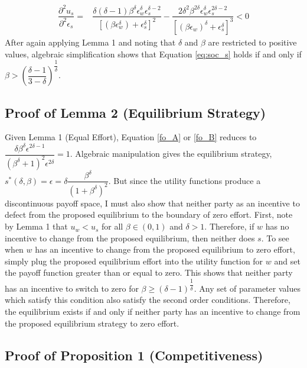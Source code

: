 \documentclass[12pt]{article}
\begin{document}
\begin{appendix}
\begin{align}
\label{eq:soc_s} \dfrac{\partial ^2u_s}{\partial ^2\epsilon_s} = &\dfrac{\delta (\delta - 1) \beta^\delta \epsilon_w^{\delta} \epsilon_s^{\delta-2}}{[(\beta\epsilon_w^\delta) + \epsilon_s^\delta]^2} -\dfrac{2\delta^2 \beta^{2\delta} \epsilon_w^{\delta} \epsilon_s^{2\delta-2}}{[(\beta\epsilon_w)^\delta + \epsilon_s^\delta]^3} < 0
\end{align}
After again applying Lemma 1 and noting that $\delta$ and $\beta$ are restricted to positive values, algebraic simplification shows that Equation \ref{eq:soc_s} holds if and only if $\beta > \left (\dfrac{\delta - 1}{3 - \delta} \right ) ^{\dfrac{1}{\delta}}$.

\subsection*{Proof of Lemma 2 (Equilibrium Strategy)}

Given Lemma 1 (Equal Effort), Equation \ref{fo_A} or \ref{fo_B} reduces to $\dfrac{\delta\beta^\delta\epsilon^{2\delta-1}}{(\beta^\delta + 1)^2\epsilon^{2\delta}} = 1$. Algebraic manipulation gives the equilibrium strategy, $s^*(\delta, \beta) = \epsilon = \delta\dfrac{\beta^\delta}{(1+ \beta^\delta)^2}$. But since the utility functions produce a discontinuous payoff space, I must also show that neither party as an incentive to defect from the proposed equilibrium to the boundary of zero effort. First, note by Lemma 1 that $u_w < u_s$ for all $\beta \in (0, 1)$ and $\delta >  1$. Therefore, if $w$ has no incentive to change from the proposed equilibrium, then neither does $s$. To see when $w$ has an incentive to change from the proposed equilibrium to zero effort, simply plug the proposed equilibrium effort into the utility function for $w$ and set the payoff function greater than or equal to zero. This shows that neither party has an incentive to switch to zero for $\beta \geq (\delta - 1)^{\dfrac{1}{\delta}}$. Any set of parameter values which satisfy this condition also satisfy the second order conditions. Therefore, the equilibrium exists if and only if neither party has an incentive to change from the proposed equilibrium strategy to zero effort.

\subsection*{Proof of Proposition 1 (Competitiveness)}


\end{appendix}
\end{document}
